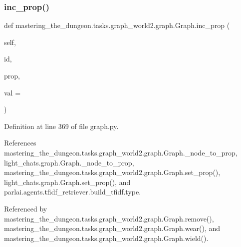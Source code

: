 \subsubsection{\texorpdfstring{inc\+\_\+prop()}{inc\_prop()}}
{\footnotesize\ttfamily def mastering\+\_\+the\+\_\+dungeon.\+tasks.\+graph\+\_\+world2.\+graph.\+Graph.\+inc\+\_\+prop (\begin{DoxyParamCaption}\item[{}]{self,  }\item[{}]{id,  }\item[{}]{prop,  }\item[{}]{val = {} }\end{DoxyParamCaption})}



Definition at line 369 of file graph.\+py.



References mastering\+\_\+the\+\_\+dungeon.\+tasks.\+graph\+\_\+world2.\+graph.\+Graph.\+\_\+node\+\_\+to\+\_\+prop, light\+\_\+chats.\+graph.\+Graph.\+\_\+node\+\_\+to\+\_\+prop, mastering\+\_\+the\+\_\+dungeon.\+tasks.\+graph\+\_\+world2.\+graph.\+Graph.\+set\+\_\+prop(), light\+\_\+chats.\+graph.\+Graph.\+set\+\_\+prop(), and parlai.\+agents.\+tfidf\+\_\+retriever.\+build\+\_\+tfidf.\+type.



Referenced by mastering\+\_\+the\+\_\+dungeon.\+tasks.\+graph\+\_\+world2.\+graph.\+Graph.\+remove(), mastering\+\_\+the\+\_\+dungeon.\+tasks.\+graph\+\_\+world2.\+graph.\+Graph.\+wear(), and mastering\+\_\+the\+\_\+dungeon.\+tasks.\+graph\+\_\+world2.\+graph.\+Graph.\+wield().


